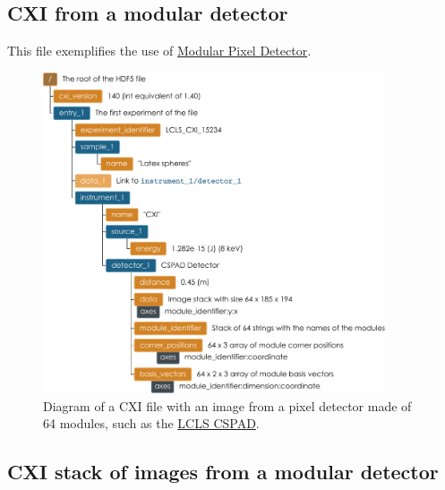 \documentclass[usletter,11pt]{article}
\begin{document}
\clearpage

\subsection{CXI from a modular detector}

This file exemplifies the use of \hyperref[subsec:modularDetectors]{Modular
  Pixel Detector}.
\begin{figure}[h!]
\centering
\includegraphics[width=0.9\textwidth]{modular_detector_cxi.pdf}
\caption{Diagram of a CXI file with an image from a pixel detector made of 64
  modules, such as the \hyperref[fig:cspad]{LCLS CSPAD}.}
\label{fig:modular_detector_cxi}
\end{figure}
\clearpage


\subsection{CXI stack of images from a modular detector}
\end{document}
